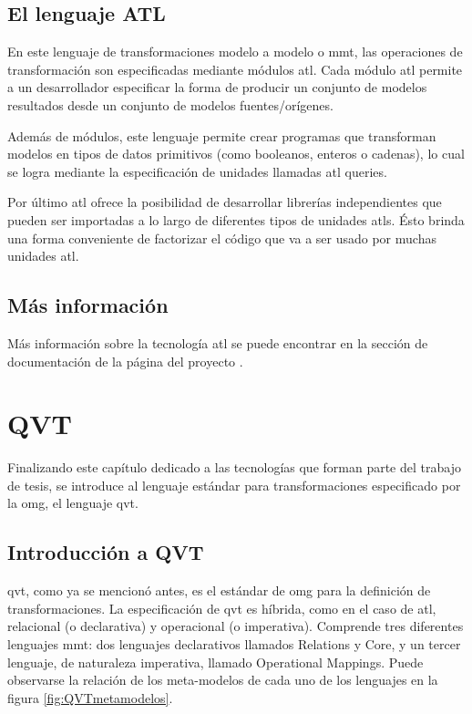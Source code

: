 \documentclass[a4paper,12pt,twoside,spanish,openright]{book}
\begin{document}
\subsection{El lenguaje ATL}

En este lenguaje de transformaciones modelo a modelo o \gls{mmt}, las operaciones de transformación son especificadas mediante módulos \gls{atl}. Cada módulo \gls{atl} permite a un desarrollador especificar la forma de producir un conjunto de modelos resultados desde un conjunto de modelos fuentes/orígenes. 

Además de módulos, este lenguaje permite crear programas que transforman modelos en tipos de datos primitivos (como booleanos, enteros o cadenas), lo cual se logra mediante la especificación de unidades llamadas \gls{atl} queries.

Por último \gls{atl} ofrece la posibilidad de desarrollar librerías independientes que pueden ser importadas a lo largo de diferentes tipos de unidades \glspl{atl}. Ésto brinda una forma conveniente de factorizar el código que va a ser usado por muchas unidades \gls{atl}.


\subsection{Más información}

Más información sobre la tecnología \gls{atl} se puede encontrar en la sección de documentación de la página del proyecto \cite[\url{www.eclipse.org/atl/}]{ATL}.


\section{QVT}
\label{sec:QVT}

Finalizando este capítulo dedicado a las tecnologías que forman parte del trabajo de tesis, se introduce al lenguaje estándar para transformaciones especificado por la \gls{omg}, el lenguaje \gls{qvt}.


\subsection{Introducción a QVT}

\gls{qvt}, como ya se mencionó antes, es el estándar de \gls{omg} para la definición de transformaciones. La especificación de \gls{qvt} es híbrida, como en el caso de \gls{atl}, relacional (o declarativa) y operacional (o imperativa). Comprende tres diferentes lenguajes \gls{mmt}: dos lenguajes declarativos llamados \textsf{Relations} y \textsf{Core}, y un tercer lenguaje, de naturaleza imperativa, llamado \textsf{Operational Mappings}. Puede observarse la relación de los meta-modelos de cada uno de los lenguajes en la figura \ref{fig:QVTmetamodelos}. 
\end{document}
